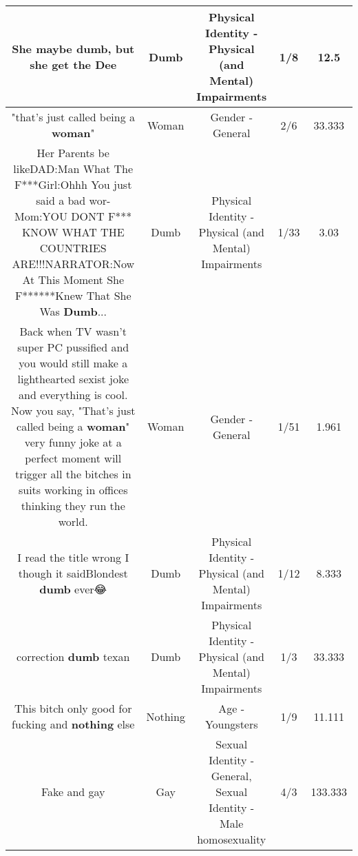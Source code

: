 \documentclass[11pt]{article}
\newlength\mylength
\begin{document}
\begin{center}
\begin{longtable}{|C{.65\mylength}|C{.30\mylength}|C{.12\mylength}|C{.12\mylength}|C{.12\mylength}|}
  \small She maybe \textbf{dumb}, but she get the Dee\normalsize   & Dumb & Physical Identity - Physical (and Mental) Impairments & 1/8 & 12.5 \\  \hline
  \small "that's just called being a \textbf{woman}"\normalsize   & Woman & Gender - General & 2/6 & 33.333 \\  \hline
  \small Her Parents be likeDAD:Man What The F***Girl:Ohhh You just said a bad wor-Mom:YOU DONT F*** KNOW WHAT THE COUNTRIES ARE!!!NARRATOR:Now At This Moment She F******Knew That She Was \textbf{Dumb}...\normalsize   & Dumb & Physical Identity - Physical (and Mental) Impairments & 1/33 & 3.03 \\  \hline
  \small Back when TV wasn't super PC pussified and you would still make a lighthearted sexist joke and everything is cool. Now you say, "That's just called being a \textbf{woman}" very funny joke at a perfect moment will trigger all the bitches in suits working in offices thinking they run the world.\normalsize   & Woman & Gender - General & 1/51 & 1.961 \\  \hline
  \small I read the title wrong I though it saidBlondest \textbf{dumb} ever😂\normalsize   & Dumb & Physical Identity - Physical (and Mental) Impairments & 1/12 & 8.333 \\  \hline
  \small correction \textbf{dumb} texan\normalsize   & Dumb & Physical Identity - Physical (and Mental) Impairments & 1/3 & 33.333 \\  \hline
  \small This bitch only good for fucking and  \textbf{nothing} else\normalsize   & Nothing & Age - Youngsters & 1/9 & 11.111 \\  \hline
  \small Fake and gay\normalsize   & Gay & Sexual Identity - General, Sexual Identity - Male homosexuality & 4/3 & 133.333 \\  \hline

\end{longtable}
\end{center}
\end{document}
